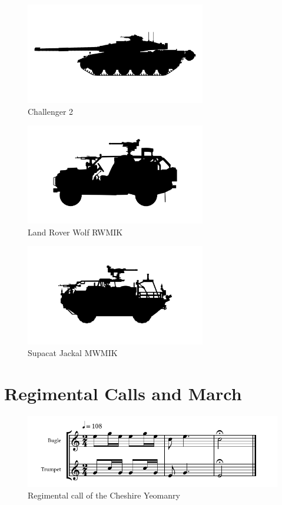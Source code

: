 \begin{figure}[h]
  \centering
  \includegraphics[width=0.7\textwidth]{platforms/challenger.pdf}
  \caption*{Challenger 2}
\end{figure}

\begin{figure}[h]
  \centering
  \includegraphics[width=0.7\textwidth]{platforms/wmik.pdf}
  \caption*{Land Rover Wolf RWMIK}
\end{figure}

\begin{figure}[h]
  \centering
  \includegraphics[width=0.7\textwidth]{platforms/jackal.pdf}
  \caption*{Supacat Jackal MWMIK}
\end{figure}

\chapter{Regimental Calls and March}

\begin{figure}[h]
  \centering
  \includegraphics[width=\textwidth]{gazette/cheshire-yeomanry-call.pdf}
  \caption*{Regimental call of the Cheshire Yeomanry}
\end{figure}

